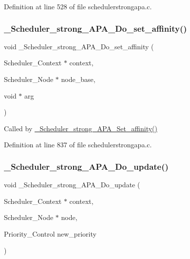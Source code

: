 Definition at line 528 of file schedulerstrongapa.\+c.

\mbox{\label{group__RTEMSScoreSchedulerStrongAPA_ga5a91c9d6e7fbc55bda26161294fb8b6f}} 
\subsubsection{\texorpdfstring{\+\_\+\+Scheduler\+\_\+strong\+\_\+\+A\+P\+A\+\_\+\+Do\+\_\+set\+\_\+affinity()}{\_Scheduler\_strong\_APA\_Do\_set\_affinity()}}
{\footnotesize\ttfamily void \+\_\+\+Scheduler\+\_\+strong\+\_\+\+A\+P\+A\+\_\+\+Do\+\_\+set\+\_\+affinity (\begin{DoxyParamCaption}\item[{Scheduler\+\_\+\+Context $\ast$}]{context,  }\item[{Scheduler\+\_\+\+Node $\ast$}]{node\+\_\+base,  }\item[{void $\ast$}]{arg }\end{DoxyParamCaption})}



Called by \hyperlink{group__RTEMSScoreSchedulerStrongAPA_ga63ef624a9881cf77a2b1eef2c6f05223}{\+\_\+\+Scheduler\+\_\+strong\+\_\+\+A\+P\+A\+\_\+\+Set\+\_\+affinity()} 



Definition at line 837 of file schedulerstrongapa.\+c.

\mbox{\label{group__RTEMSScoreSchedulerStrongAPA_ga093f8f4d503edc228e9819353be72dbc}} 
\subsubsection{\texorpdfstring{\+\_\+\+Scheduler\+\_\+strong\+\_\+\+A\+P\+A\+\_\+\+Do\+\_\+update()}{\_Scheduler\_strong\_APA\_Do\_update()}}
{\footnotesize\ttfamily void \+\_\+\+Scheduler\+\_\+strong\+\_\+\+A\+P\+A\+\_\+\+Do\+\_\+update (\begin{DoxyParamCaption}\item[{Scheduler\+\_\+\+Context $\ast$}]{context,  }\item[{Scheduler\+\_\+\+Node $\ast$}]{node,  }\item[{Priority\+\_\+\+Control}]{new\+\_\+priority }\end{DoxyParamCaption})}



